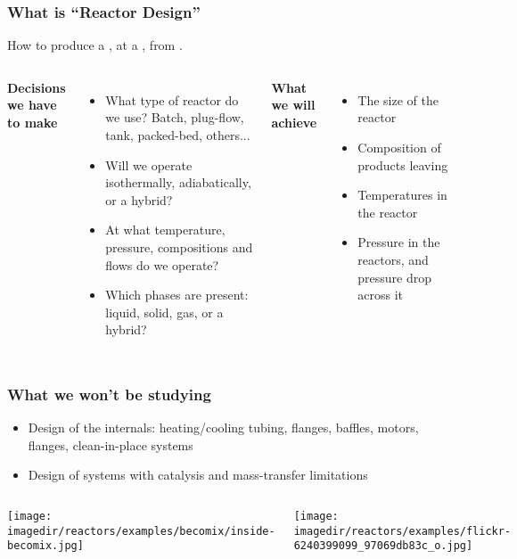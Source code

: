 \begin{frame}\frametitle{What is ``Reactor Design''}
	\begin{exampleblock}{}
		How to produce a {\color{purple}{specified product}}, at a {\color{orange}{given rate}}, from {\color{myGreen}{known reactants}}.
	\end{exampleblock}
	\vspace{12pt}
	\begin{columns}[t]
			\textbf{Decisions we have to make}
			\begin{itemize}
				\item	What type of reactor do we use? Batch, plug-flow, tank, packed-bed, others...
				\item	Will we operate isothermally, adiabatically, or a hybrid?
				\item	At what temperature, pressure, compositions and flows do we operate?
				\item	Which phases are present: liquid, solid, gas, or a hybrid?
			\end{itemize}

			\textbf{What we will achieve}
			\begin{itemize}
				\item	The size of the reactor
				\item	Composition of products leaving
				\item	Temperatures in the reactor
				\item	Pressure in the reactors, and pressure drop across it
			\end{itemize}
	\end{columns}
\end{frame}

\begin{frame}\frametitle{What we won't be studying}
	\begin{itemize}
		\item	Design of the internals: heating/cooling tubing, flanges, baffles, motors, flanges, clean-in-place systems
		\item	Design of systems with catalysis and mass-transfer limitations
	\end{itemize}
	\vspace{-12pt}
	\begin{columns}[t]
			\begin{center}
		\texttt{[image: \\imagedir/reactors/examples/becomix/inside-becomix.jpg]}
	\end{center}
			\begin{center}
				\texttt{[image: \\imagedir/reactors/examples/flickr-6240399099\_97069db83c\_o.jpg]}
			\end{center}
			
	\end{columns}	
\end{frame}

